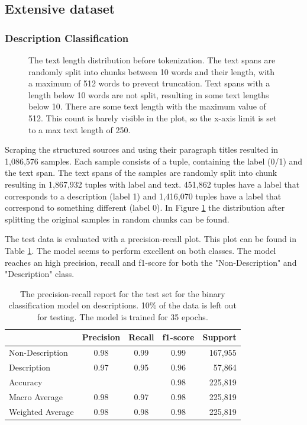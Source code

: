 \documentclass[a4paper, 12pt, oneside]{book} %
\begin{document}
\subsection{Extensive dataset}
\subsubsection{Description Classification}

\begin{figure} [t]
    \centering
    \vspace{0cm}
    \makebox[\textwidth][c]{}
    \caption{The text length distribution before tokenization. The text spans are randomly split into chunks between 10 words and their length, with a maximum of 512 words to prevent truncation. Text spans with a length below 10 words are not split, resulting in some text lengths below 10. There are some text length with the maximum value of 512. This count is barely visible in the plot, so the x-axis limit is set to a max text length of 250.}
    \label{fig:text_length_distribution}
\end{figure}

Scraping the structured sources and using their paragraph titles resulted in 1,086,576 samples.
Each sample consists of a tuple, containing the label (0/1) and the text span.
The text spans of the samples are randomly split into chunk resulting in 1,867,932 tuples with label and text.
451,862 tuples have a label that corresponds to a description (label 1) and 1,416,070 tuples have a label that correspond to something different (label 0).
In Figure \ref{fig:text_length_distribution} the distribution after splitting the original samples in random chunks can be found.

The test data is evaluated with a precision-recall plot.
This plot can be found in Table \ref{tab:precision_recall_descriptionsmodel}.
The model seems to perform excellent on both classes.
The model reaches an high precision, recall and f1-score for both the "Non-Description" and "Description" class.

\begin{table}[h]
\centering
\caption{The precision-recall report for the test set for the binary classification model on descriptions. 10\% of the data is left out for testing. The model is trained for 35 epochs.}
\label{tab:precision_recall_descriptionsmodel}
\begin{tabular}{@{}lcccr@{}}
\cmidrule(l){2-5}
 & \multicolumn{1}{l}{Precision} & \multicolumn{1}{l}{Recall} & \multicolumn{1}{l}{f1-score} & \multicolumn{1}{l}{Support} \\ \midrule
Non-Description  & 0.98 & 0.99 & 0.99 & 167,955 \\
Description      & 0.97 & 0.95 & 0.96 & 57,864  \\ \midrule
Accuracy         &      &      & 0.98 & 225,819 \\
Macro Average    & 0.98 & 0.97 & 0.98 & 225,819 \\
Weighted Average & 0.98 & 0.98 & 0.98 & 225,819 \\ \bottomrule
\end{tabular}
\end{table}
\end{document}
